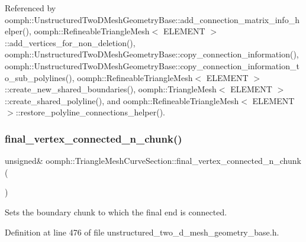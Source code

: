 Referenced by oomph\+::\+Unstructured\+Two\+D\+Mesh\+Geometry\+Base\+::add\+\_\+connection\+\_\+matrix\+\_\+info\+\_\+helper(), oomph\+::\+Refineable\+Triangle\+Mesh$<$ E\+L\+E\+M\+E\+N\+T $>$\+::add\+\_\+vertices\+\_\+for\+\_\+non\+\_\+deletion(), oomph\+::\+Unstructured\+Two\+D\+Mesh\+Geometry\+Base\+::copy\+\_\+connection\+\_\+information(), oomph\+::\+Unstructured\+Two\+D\+Mesh\+Geometry\+Base\+::copy\+\_\+connection\+\_\+information\+\_\+to\+\_\+sub\+\_\+polylines(), oomph\+::\+Refineable\+Triangle\+Mesh$<$ E\+L\+E\+M\+E\+N\+T $>$\+::create\+\_\+new\+\_\+shared\+\_\+boundaries(), oomph\+::\+Triangle\+Mesh$<$ E\+L\+E\+M\+E\+N\+T $>$\+::create\+\_\+shared\+\_\+polyline(), and oomph\+::\+Refineable\+Triangle\+Mesh$<$ E\+L\+E\+M\+E\+N\+T $>$\+::restore\+\_\+polyline\+\_\+connections\+\_\+helper().

\mbox{\label{classoomph_1_1TriangleMeshCurveSection_a7762be2ff2f975f38365c6dc50719664}} 
\subsubsection{\texorpdfstring{final\+\_\+vertex\+\_\+connected\+\_\+n\+\_\+chunk()}{final\_vertex\_connected\_n\_chunk()}\hspace{0.1cm}{\footnotesize\ttfamily [2/2]}}
{\footnotesize\ttfamily unsigned\& oomph\+::\+Triangle\+Mesh\+Curve\+Section\+::final\+\_\+vertex\+\_\+connected\+\_\+n\+\_\+chunk (\begin{DoxyParamCaption}{ }\end{DoxyParamCaption})\hspace{0.3cm}{\ttfamily [inline]}}



Sets the boundary chunk to which the final end is connected. 



Definition at line 476 of file unstructured\+\_\+two\+\_\+d\+\_\+mesh\+\_\+geometry\+\_\+base.\+h.

\mbox{\label{classoomph_1_1TriangleMeshCurveSection_a6fa5fb8407dfe3f0d6624ceb0ac822a5}} 
